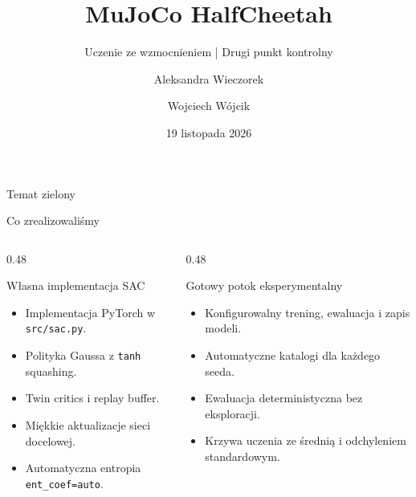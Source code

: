\documentclass[aspectratio=169,11pt]{beamer}
\title{MuJoCo HalfCheetah}
\subtitle{Uczenie ze wzmocnieniem \quad | \quad Drugi punkt kontrolny}
\author{Aleksandra Wieczorek \and Wojciech W\'ojcik}
\institute{Politechnika Warszawska}
\date{19 listopada 2026}
\begin{document}
\begin{frame}
  \titlepage
  \vspace{-0.5em}
  \begin{center}\small Temat zielony\end{center}
\end{frame}

\begin{frame}{Co zrealizowaliśmy}
  \begin{columns}[T,onlytextwidth]
    \begin{column}{0.48\textwidth}
      \begin{block}{Własna implementacja SAC}
        \begin{itemize}
          \item Implementacja PyTorch w \texttt{src/sac.py}.
          \item Polityka Gaussa z \texttt{tanh} squashing.
          \item Twin critics i replay buffer.
          \item Miękkie aktualizacje sieci docelowej.
          \item Automatyczna entropia \texttt{ent\_coef=auto}.
        \end{itemize}
      \end{block}
    \end{column}
    \begin{column}{0.48\textwidth}
      \begin{block}{Gotowy potok eksperymentalny}
        \begin{itemize}
          \item Konfigurowalny trening, ewaluacja i zapis modeli.
          \item Automatyczne katalogi dla każdego seeda.
          \item Ewaluacja deterministyczna bez eksploracji.
          \item Krzywa uczenia ze średnią i odchyleniem standardowym.
        \end{itemize}
      \end{block}
    \end{column}
  \end{columns}
\end{frame}
\end{document}

